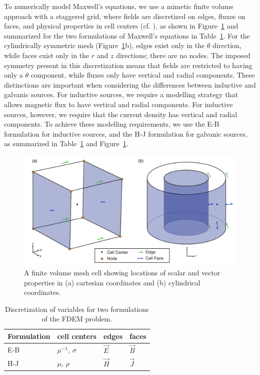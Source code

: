 \documentclass{segabs}
\begin{document}
To numerically model Maxwell's equations, we use a mimetic finite volume approach with a staggered grid, where fields are discretized on edges, fluxes on faces, and physical properties in cell centers (cf. \cite{Haber2014a}), as shown in Figure~\ref{fig:fvcells} and summarized for the two formulations of Maxwell's equations in Table~\ref{tab:DiscEBHJ}. For the cylindrically symmetric mesh (Figure~\ref{fig:fvcells}b), edges exist only in the $\theta$ direction, while faces exist only in the $r$ and $z$ directions; there are no nodes. The imposed symmetry present in this discretization means that fields are restricted to having only a $\theta$ component, while fluxes only have vertical and radial components. These distinctions are important when considering the differences between inductive and galvanic sources. For inductive sources, we require a modelling strategy that allows magnetic flux to have vertical and radial components. For inductive sources, however, we require that the current density has vertical and radial components. To achieve these modelling requirements, we use the E-B formulation for inductive sources, and the H-J formulation for galvanic sources, as summarized in Table~\ref{tab:DiscEBHJ} and Figure~\ref{fig:fvcells}. 
\begin{figure}[h!]
	\centering
	\includegraphics[width=0.9\columnwidth]{./Figures/FVcubes}
	\caption{A finite volume mesh cell showing locations of scalar and vector properties in (a) cartesian coordinates and (b) cylindrical coordinates.}
	\label{fig:fvcells}
\end{figure}
\begin{table}[h!]
\centering
\begin{tabular}{| l | l | l | l |}
	\hline
	\textbf{Formulation} & \textbf{cell centers} & \textbf{edges} & \textbf{faces} \\
	\hline
	E-B                  & $\mu^{-1}$, $\sigma$  & $\vec{E}$      & $\vec{B}$      \\
	H-J                  & $\mu$, $\rho$              & $\vec{H}$      & $\vec{J}$       \\
	\hline
	\end{tabular}	
	\label{tab:DiscEBHJ} 
	\caption{Discretization of variables for two formulations of the FDEM problem.}
\end{table}
\end{document}
